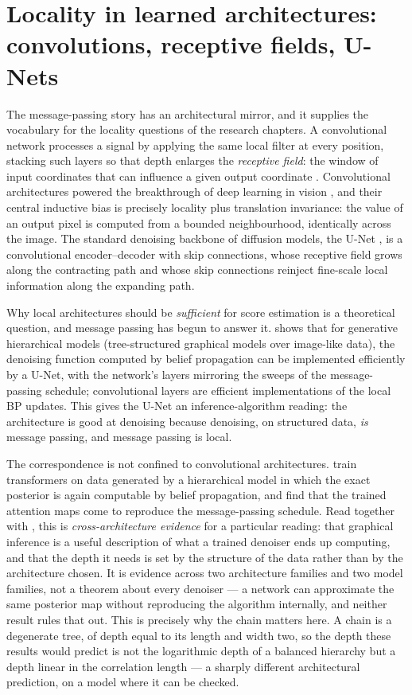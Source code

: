 \section{Locality in learned architectures: convolutions, receptive
fields, U-Nets}\label{sec:cnn-locality}

The message-passing story has an architectural mirror, and it supplies
the vocabulary for the locality questions of the research chapters. A
convolutional network processes a signal by applying the same local
filter at every position, stacking such layers so that depth enlarges
the \emph{receptive field}: the window of input coordinates that can
influence a given output coordinate \citep{lecun2015deep}. Convolutional
architectures powered the breakthrough of deep learning in vision
\citep{krizhevsky2012imagenet}, and their central inductive bias is
precisely locality plus translation invariance: the value of an output
pixel is computed from a bounded neighbourhood, identically across the
image. The standard denoising backbone of diffusion models, the U-Net
\citep{ronneberger2015unet, ho2020denoising}, is a convolutional
encoder--decoder with skip connections, whose receptive field grows
along the contracting path and whose skip connections reinject
fine-scale local information along the expanding path.

Why local architectures should be \emph{sufficient} for score estimation
is a theoretical question, and message passing has begun to answer it.
\citet{mei2024unets} shows that for generative hierarchical models
(tree-structured graphical models over image-like data), the denoising
function computed by belief propagation can be implemented efficiently
by a U-Net, with the network's layers mirroring the sweeps of the
message-passing schedule; convolutional layers are efficient
implementations of the local BP updates. This gives the U-Net an
inference-algorithm reading: the architecture is good at denoising
because denoising, on structured data, \emph{is} message passing, and
message passing is local.

The correspondence is not confined to convolutional architectures.
\citet{garnierbrun2024transformers} train transformers on data generated
by a hierarchical model in which the exact posterior is again computable
by belief propagation, and find that the trained attention maps come to
reproduce the message-passing schedule. Read together with
\citet{mei2024unets}, this is \emph{cross-architecture evidence} for a
particular reading: that graphical inference is a useful description of what a
trained denoiser ends up computing, and that the depth it needs is set by the
structure of the data rather than by the architecture chosen. It is evidence
across two architecture families and two model families, not a theorem about
every denoiser --- a network can approximate the same posterior map without
reproducing the algorithm internally, and neither result rules that out. This is
precisely why the chain matters here. A chain is a
degenerate tree, of depth equal to its length and width two, so the depth
these results would predict is not the logarithmic depth of a balanced
hierarchy but a depth linear in the correlation length --- a sharply
different architectural prediction, on a model where it can be checked.

